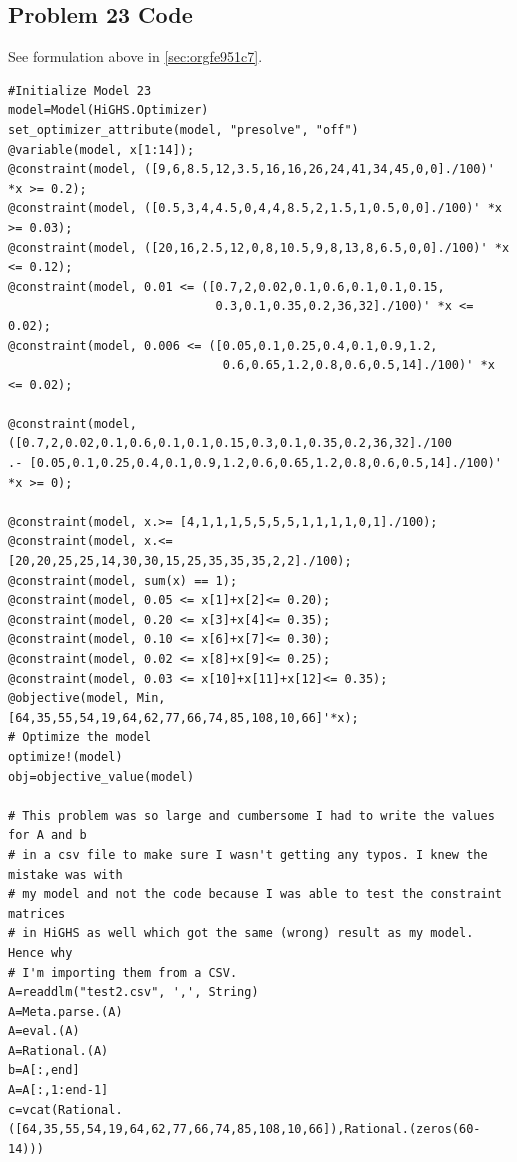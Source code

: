 \documentclass[11pt]{article}
\begin{document}
\subsection{Problem 23 Code}
\label{sec:org3cb218a}
See formulation above in \ref{sec:orgfe951c7}.
\begin{verbatim}
#Initialize Model 23
model=Model(HiGHS.Optimizer)
set_optimizer_attribute(model, "presolve", "off")
@variable(model, x[1:14]);
@constraint(model, ([9,6,8.5,12,3.5,16,16,26,24,41,34,45,0,0]./100)' *x >= 0.2);
@constraint(model, ([0.5,3,4,4.5,0,4,4,8.5,2,1.5,1,0.5,0,0]./100)' *x >= 0.03);
@constraint(model, ([20,16,2.5,12,0,8,10.5,9,8,13,8,6.5,0,0]./100)' *x <= 0.12);
@constraint(model, 0.01 <= ([0.7,2,0.02,0.1,0.6,0.1,0.1,0.15,
                             0.3,0.1,0.35,0.2,36,32]./100)' *x <= 0.02);
@constraint(model, 0.006 <= ([0.05,0.1,0.25,0.4,0.1,0.9,1.2,
                              0.6,0.65,1.2,0.8,0.6,0.5,14]./100)' *x <= 0.02);

@constraint(model, ([0.7,2,0.02,0.1,0.6,0.1,0.1,0.15,0.3,0.1,0.35,0.2,36,32]./100
.- [0.05,0.1,0.25,0.4,0.1,0.9,1.2,0.6,0.65,1.2,0.8,0.6,0.5,14]./100)' *x >= 0);

@constraint(model, x.>= [4,1,1,1,5,5,5,5,1,1,1,1,0,1]./100);
@constraint(model, x.<= [20,20,25,25,14,30,30,15,25,35,35,35,2,2]./100);
@constraint(model, sum(x) == 1);
@constraint(model, 0.05 <= x[1]+x[2]<= 0.20);
@constraint(model, 0.20 <= x[3]+x[4]<= 0.35);
@constraint(model, 0.10 <= x[6]+x[7]<= 0.30);
@constraint(model, 0.02 <= x[8]+x[9]<= 0.25);
@constraint(model, 0.03 <= x[10]+x[11]+x[12]<= 0.35);
@objective(model, Min, [64,35,55,54,19,64,62,77,66,74,85,108,10,66]'*x);
# Optimize the model
optimize!(model)
obj=objective_value(model)

# This problem was so large and cumbersome I had to write the values for A and b
# in a csv file to make sure I wasn't getting any typos. I knew the mistake was with
# my model and not the code because I was able to test the constraint matrices
# in HiGHS as well which got the same (wrong) result as my model. Hence why
# I'm importing them from a CSV.
A=readdlm("test2.csv", ',', String)
A=Meta.parse.(A)
A=eval.(A)
A=Rational.(A)
b=A[:,end]
A=A[:,1:end-1]
c=vcat(Rational.([64,35,55,54,19,64,62,77,66,74,85,108,10,66]),Rational.(zeros(60-14)))


\end{verbatim}
\end{document}
